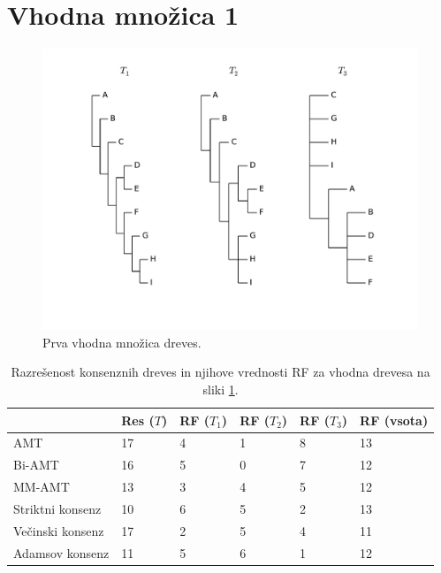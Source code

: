 \documentclass[a4paper, 12pt]{book}
\begin{document}
\section{Vhodna množica 1}
\begin{figure}[h!]
	\begin{center}
		\includegraphics[scale=0.45, clip=true, trim=1cm 2cm 1cm 0]{gfx/eval_input.pdf}
	\end{center}
	\caption{Prva vhodna množica dreves.}
	\label{img-eval-input}
\end{figure}

\begin{table}[h!]
	\begin{center}
	{\footnotesize
	\begin{tabular}{ l| l | l | l | l | l }
	~                & Res ($T$) & RF ($T_1$) & RF ($T_2$) & RF ($T_3$) & RF (vsota) \\ \hline
	AMT              & 17          & 4             & 1             & 8             & 13         \\ \hline
	Bi-AMT           & 16          & 5             & 0             & 7             & 12         \\ \hline
	MM-AMT           & 13          & 3             & 4             & 5             & 12         \\ \hline
	Striktni konsenz & 10          & 6             & 5             & 2             & 13         \\ \hline
	Večinski konsenz & 17          & 2             & 5             & 4             & 11         \\ \hline
	Adamsov konsenz  & 11          & 5             & 6             & 1             & 12         \\ \hline
	\end{tabular}
	\caption{\label{table-eval-1}Razrešenost konsenznih dreves in njihove vrednosti RF za vhodna drevesa na sliki \ref{img-eval-input}.
    }
	}
	\end{center}		
\end{table}
\end{document}
